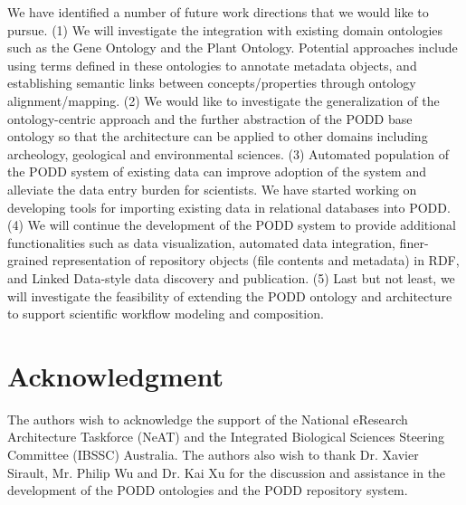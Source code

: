 \documentclass[conference,10pt]{IEEEtran}
\begin{document}
We have identified a number of future work directions that we would like to pursue. (1) We will investigate the integration with existing domain ontologies such as the Gene Ontology and the Plant Ontology. Potential approaches include using terms defined in these ontologies to annotate metadata objects, and establishing semantic links between concepts/properties through ontology alignment/mapping. (2) We would like to investigate the generalization of the ontology-centric approach and the further abstraction of the PODD base ontology so that the architecture can be applied to other domains including archeology, geological and environmental sciences. (3) Automated population of the PODD system of existing data can improve adoption of the system and alleviate the data entry burden for scientists. We have started working on developing tools for importing existing data in relational databases into PODD. (4) We will continue the development of the PODD system to provide additional functionalities such as data visualization, automated data integration, finer-grained representation of repository objects (file contents and metadata) in RDF, and Linked Data-style data discovery and publication. (5) Last but not least, we will investigate the feasibility of extending the PODD ontology and architecture to support scientific workflow modeling and composition.

\section*{Acknowledgment}
The authors wish to acknowledge the support of the National eResearch Architecture Taskforce (NeAT) and the Integrated Biological Sciences Steering Committee (IBSSC) Australia. The authors also wish to thank Dr. Xavier Sirault, Mr. Philip Wu and Dr. Kai Xu for the discussion and assistance in the development of the PODD ontologies and the PODD repository system.



\end{document}

